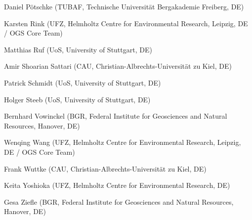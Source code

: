 \begin{list}{-}{\leftmargin=1em \itemindent=0em \itemsep=0.1em}
\item Daniel P\"otschke (TUBAF, Technische Universit\"at Bergakademie Freiberg, DE)
\item Karsten Rink (UFZ, Helmholtz Centre for Environmental Research, Leipzig, DE / OGS Core Team) 
\item Matthias Ruf (UoS, University of Stuttgart, DE)
\item Amir Shoarian Sattari (CAU, Christian-Albrechts-Universität zu Kiel, DE)
\item Patrick Schmidt (UoS, University of Stuttgart, DE)	
\item Holger Steeb (UoS, University of Stuttgart, DE)	
\item Bernhard Vowinckel (BGR, Federal Institute for Geosciences and Natural Resources, Hanover, DE)	\item Wenqing Wang (UFZ, Helmholtz Centre for Environmental Research, Leipzig, DE / OGS Core Team) 
\item Frank Wuttke (CAU, Christian-Albrechts-Universität zu Kiel, DE)	
\item Keita Yoshioka (UFZ, Helmholtz Centre for Environmental Research, DE) 
\item Gesa Ziefle (BGR, Federal Institute for Geosciences and Natural Resources, Hanover, DE)	
\end{list}